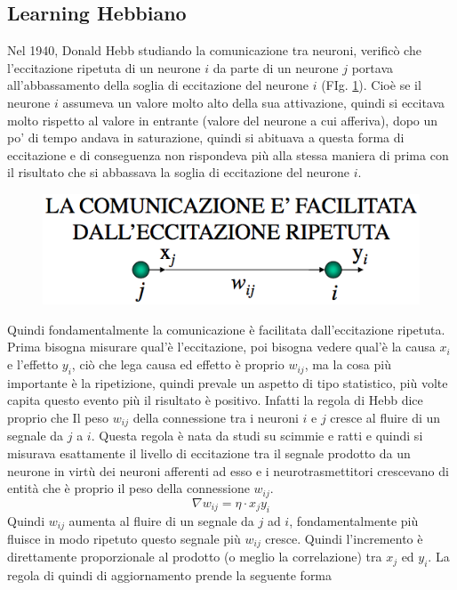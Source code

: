\subsection{Learning Hebbiano}
\noindent Nel 1940, Donald Hebb studiando la comunicazione tra neuroni, verificò che l’eccitazione ripetuta di un neurone $i$ da parte di un neurone $j$ portava all’abbassamento della soglia di eccitazione del neurone $i$ (FIg. \ref{hebb}).  Cioè se il neurone $i$ assumeva un valore molto alto della sua attivazione, quindi si eccitava molto rispetto al valore in entrante (valore del neurone a cui afferiva), dopo un po' di tempo andava in saturazione, quindi si abituava a questa forma di eccitazione e di conseguenza non rispondeva più alla stessa maniera di prima con il risultato che si abbassava la soglia di eccitazione del neurone $i$. 
\begin{figure}[h]
\centering
\includegraphics[scale=0.5]{img/hebb.png}
\caption{}
\label{hebb}
\end{figure}
Quindi fondamentalmente la comunicazione è facilitata dall'eccitazione ripetuta. Prima bisogna misurare qual'è l'eccitazione, poi bisogna vedere qual'è la causa $x_i$ e l'effetto $y_i$, ciò che lega causa ed effetto è proprio $w_{ij}$, ma la cosa più importante è la ripetizione, quindi prevale un aspetto di tipo statistico, più volte capita questo evento più il risultato è positivo. Infatti la regola di Hebb dice proprio che Il peso $w_{ij}$ della connessione tra i neuroni $i$ e $j$ cresce al fluire di un segnale da $j$ a $i$. Questa regola è nata da studi su scimmie e ratti e quindi si misurava esattamente il livello di eccitazione tra il segnale prodotto da un neurone in virtù dei neuroni afferenti ad esso e i neurotrasmettitori crescevano di entità che è proprio il peso della connessione $w_{ij}$. 
\begin{equation}
\nabla w_{ij} = \eta \cdot x_j y_i
\end{equation}
Quindi $w_{ij}$ aumenta al fluire di un segnale da $j$ ad $i$, fondamentalmente più fluisce in modo ripetuto questo segnale più $w_{ij}$ cresce. Quindi l'incremento è direttamente proporzionale al prodotto (o meglio la correlazione) tra $x_j$ ed $y_i$. La regola di quindi di aggiornamento prende la seguente forma
